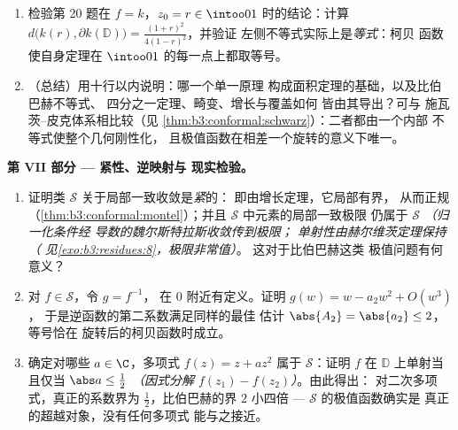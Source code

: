 \begin{problem}
\begin{enumerate}[resume]
{        且 $\psi$ 为将 $0$ 映到
        $z_0$ 的圆盘自同构）}。为何 $\partial f(\mathbb D)$ 非空？
  \item 检验第 20 题在 $f = k$，$z_0 = r \in
        \intoo01$ 时的结论：计算 $d\bigl(k(r), \partial k(\mathbb
        D)\bigr) = \frac{(1+r)^2}{4(1-r)^2}$，并验证
        左侧不等式实际上是\emph{等式}：柯贝
        函数使自身定理在
        $\intoo01$ 的每一点上都取等号。
  \item （总结）用十行以内说明：哪一个单一原理
        构成面积定理的基础，以及比伯巴赫不等式、
        四分之一定理、畸变、增长与覆盖如何
        皆由其导出？可与
        施瓦茨--皮克体系相比较（见
        \cref{thm:b3:conformal:schwarz}）：二者都由一个内部
        不等式使整个几何刚性化，
        且极值函数在相差一个旋转的意义下唯一。

\end{enumerate}
\medskip
\noindent\textbf{第 VII 部分 --- 紧性、逆映射与
现实检验。}
\begin{enumerate}[resume]
  \item 证明类 $\mathcal S$ 关于局部一致收敛是\emph{紧}的：
        即由增长定理，它局部有界，
        从而正规
        （\cref{thm:b3:conformal:montel}）；并且
        $\mathcal S$ 中元素的局部一致极限
        仍属于 $\mathcal S$ \emph{（归一化条件经
        导数的魏尔斯特拉斯收敛传到极限；
        单射性由赫尔维茨定理保持（
        见\cref{exo:b3:residues:8}，极限非常值）}。
        这对于比伯巴赫这类
        极值问题有何意义？
  \item 对 $f \in \mathcal S$，令 $g = f^{-1}$，
        在 $0$ 附近有定义。证明 $g(w) = w - a_2w^2 + O(w^3)$，
        于是逆函数的第二系数满足同样的最佳
        估计 $\abs{A_2} = \abs{a_2} \leq 2$，等号恰在
        旋转后的柯贝函数时成立。
  \item 确定对哪些 $a \in \C$，多项式 $f(z)
        = z + az^2$ 属于 $\mathcal S$：证明 $f$ 在
        $\mathbb D$ 上单射当且仅当 $\abs a \leq \frac12$
        \emph{（因式分解 $f(z_1) - f(z_2)$）}。由此得出：
        对二次多项式，真正的系数界为
        $\frac12$，比伯巴赫的界 $2$ 小四倍
        --- $\mathcal S$ 的极值函数确实是
        真正的超越对象，没有任何多项式
        能与之接近。
\end{enumerate}
\end{problem}
